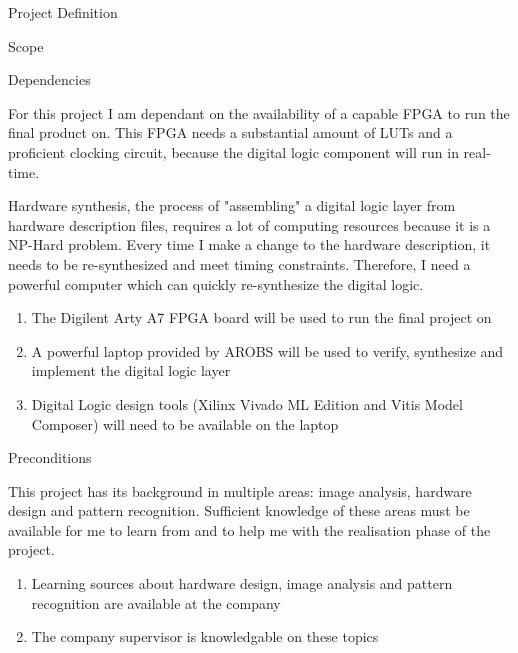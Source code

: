 \documentclass{matthijs}
\begin{document}
\begin{hoofdstuk}{Project Definition}
\begin{paragraaf}{Scope}
\begin{enumerate}
			\end{enumerate}

		\end{paragraaf}

		\begin{paragraaf}{Dependencies}

			For this project I am dependant on the availability of a capable FPGA to run the final product on.
			This FPGA needs a substantial amount of LUTs and a proficient clocking circuit, because the digital logic component will run in real-time.
			
			Hardware synthesis, the process of "assembling" a digital logic layer from hardware description files, requires a lot of computing resources because it is a NP-Hard \cite{chu2006rtl} problem.
			Every time I make a change to the hardware description, it needs to be re-synthesized and meet timing constraints.
			Therefore, I need a powerful computer which can quickly re-synthesize the digital logic.

			\begin{enumerate}

				\item The Digilent Arty A7 FPGA board will be used to run the final project on
				\item A powerful laptop provided by AROBS will be used to verify, synthesize and implement the digital logic layer
				\item Digital Logic design tools (Xilinx Vivado ML Edition and Vitis Model Composer) will need to be available on the laptop
		
			\end{enumerate}

		\end{paragraaf}

		\begin{paragraaf}{Preconditions}

			This project has its background in multiple areas: image analysis, hardware design and pattern recognition.
			Sufficient knowledge of these areas must be available for me to learn from and to help me with the realisation phase of the project.

			\begin{enumerate}

				\item Learning sources about hardware design, image analysis and pattern recognition are available at the company
				\item The company supervisor is knowledgable on these topics

			\end{enumerate}

		\end{paragraaf}

	\end{hoofdstuk}
\end{document}
